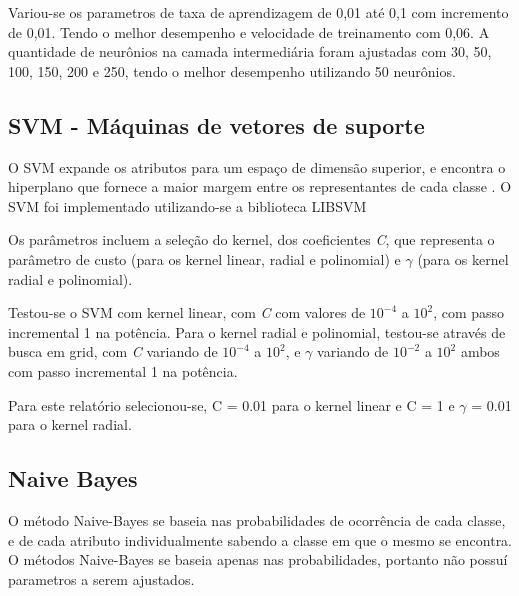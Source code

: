 Variou-se os parametros de taxa de aprendizagem de 0,01 até 0,1 com incremento de 0,01. Tendo o melhor desempenho e velocidade de treinamento com 0,06. A quantidade de neurônios na camada intermediária foram ajustadas com 30, 50, 100, 150, 200 e 250, tendo o melhor desempenho utilizando 50 neurônios.

\subsection{SVM - Máquinas de vetores de suporte}

O SVM expande os atributos para um espaço de dimensão superior, e encontra o hiperplano que fornece a maior margem entre os representantes de cada classe \cite{praticalSVM}. O SVM foi implementado utilizando-se a biblioteca LIBSVM \cite{libsvm}

Os parâmetros incluem a seleção do kernel, dos coeficientes \emph{C}, que representa o parâmetro de custo (para os kernel linear, radial e polinomial) e \(\gamma\) (para os kernel radial e polinomial).

Testou-se o SVM com kernel linear, com \emph{C} com valores de \(10^{-4}\) a \(10^2\), com passo incremental 1 na potência. Para o kernel radial e polinomial, testou-se através de busca em grid, com \emph{C} variando de \(10^{-4}\) a \(10^2\), e \(\gamma\) variando de \(10^{-2}\) a \(10^2\) ambos com passo incremental 1 na potência.

Para este relatório selecionou-se, C = 0.01 para o kernel linear e C = 1 e \(\gamma\) = 0.01 para o kernel radial.

\subsection{Naive Bayes}

O método Naive-Bayes se baseia nas probabilidades de ocorrência de cada classe, e de cada atributo individualmente sabendo a classe em que o mesmo se encontra. O métodos Naive-Bayes se baseia apenas nas probabilidades, portanto não possuí parametros a serem ajustados.

